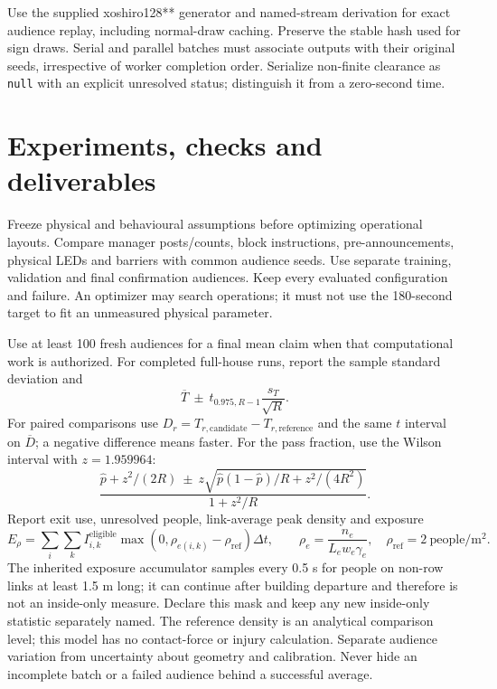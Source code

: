 \documentclass[11pt,a4paper]{article}
\newcommand{\code}[1]{{\small\nolinkurl{#1}}}
\begin{document}
Use the supplied xoshiro128** generator and named-stream derivation for exact audience replay, including normal-draw caching. Preserve the stable hash used for sign draws. Serial and parallel batches must associate outputs with their original seeds, irrespective of worker completion order. Serialize non-finite clearance as \code{null} with an explicit unresolved status; distinguish it from a zero-second time.

\section{Experiments, checks and deliverables}

Freeze physical and behavioural assumptions before optimizing operational layouts. Compare manager posts/counts, block instructions, pre-announcements, physical LEDs and barriers with common audience seeds. Use separate training, validation and final confirmation audiences. Keep every evaluated configuration and failure. An optimizer may search operations; it must not use the 180-second target to fit an unmeasured physical parameter.

Use at least 100 fresh audiences for a final mean claim when that computational work is authorized. For completed full-house runs, report the sample standard deviation and
\begin{equation}\label{impl:eq20}
 \overline T\ \pm\ t_{0.975,R-1}\frac{s_T}{\sqrt R}.
\end{equation}
For paired comparisons use $D_r=T_{r,\mathrm{candidate}}-T_{r,\mathrm{reference}}$ and the same $t$ interval on $\overline D$; a negative difference means faster. For the pass fraction, use the Wilson interval with $z=1.959964$:
\begin{equation}\label{impl:eq21}
 \frac{\widehat p+z^2/(2R)\ \pm\ z\sqrt{\widehat p(1-\widehat p)/R+z^2/(4R^2)}}
 {1+z^2/R}.
\end{equation}
Report exit use, unresolved people, link-average peak density and exposure
\begin{equation}\label{impl:eq22}
 E_\rho=\sum_i\sum_k I_{i,k}^{\mathrm{eligible}}
       \max(0,\rho_{e(i,k)}-\rho_{\mathrm{ref}})\Delta t,
 \qquad \rho_e=\frac{n_e}{L_ew_e\gamma_e},\quad\rho_{\mathrm{ref}}=2\ \mathrm{people/m^2}.
\end{equation}
The inherited exposure accumulator samples every 0.5 s for people on non-row links at least 1.5 m long; it can continue after building departure and therefore is not an inside-only measure. Declare this mask and keep any new inside-only statistic separately named. The reference density is an analytical comparison level; this model has no contact-force or injury calculation. Separate audience variation from uncertainty about geometry and calibration. Never hide an incomplete batch or a failed audience behind a successful average.
\end{document}
